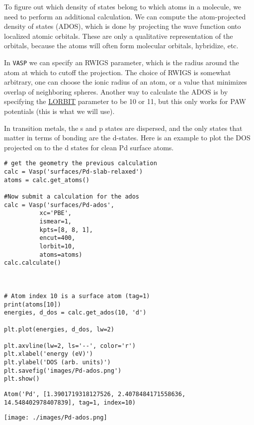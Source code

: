 \documentclass[11pt]{article}
\begin{document}
To figure out which density of states belong to which atoms in a molecule, we need to perform an additional calculation. We can compute the atom-projected density of states (ADOS), which is done by projecting the wave function onto localized atomic orbitals. These are only a qualitative representation of the orbitals, because the atoms will often form molecular orbitals, hybridize, etc. 

In \texttt{VASP} we can specify an RWIGS parameter, which is the radius around the atom at which to cutoff the projection. The choice of RWIGS is somewhat arbitrary, one can choose the ionic radius of an atom, or a value that minimizes overlap of neighboring spheres. Another way to calculate the ADOS is by specifying the \href{http://cms.mpi.univie.ac.at/vasp/vasp/LORBIT.html}{LORBIT} parameter to be 10 or 11, but this only works for PAW potentials (this is what we will use).

In transition metals, the s and p states are dispersed, and the only states that matter in terms of bonding are the d-states. Here is an example to plot the DOS projected on to the d states for clean Pd surface atoms.

\begin{verbatim}
# get the geometry the previous calculation
calc = Vasp('surfaces/Pd-slab-relaxed')
atoms = calc.get_atoms()

#Now submit a calculation for the ados
calc = Vasp('surfaces/Pd-ados',
          xc='PBE',
          ismear=1,
          kpts=[8, 8, 1],
          encut=400,
          lorbit=10,
          atoms=atoms)
calc.calculate()



# Atom index 10 is a surface atom (tag=1)
print(atoms[10])
energies, d_dos = calc.get_ados(10, 'd')

plt.plot(energies, d_dos, lw=2)

plt.axvline(lw=2, ls='--', color='r')
plt.xlabel('energy (eV)')
plt.ylabel('DOS (arb. units)')
plt.savefig('images/Pd-ados.png')
plt.show()
\end{verbatim}

\begin{verbatim}
Atom('Pd', [1.3901719318127526, 2.4078484171558636, 14.548402978407839], tag=1, index=10)
\end{verbatim}

\begin{center}
\texttt{[image: ./images/Pd-ados.png]}
\end{center}
\end{document}

